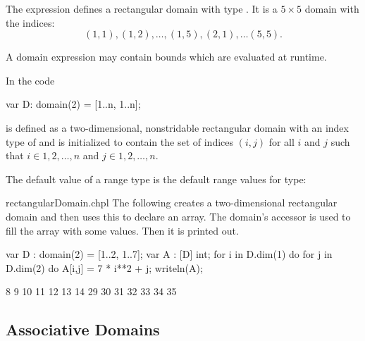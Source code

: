 \begin{example}
The expression \chpl{[1..5, 1..5]} defines a rectangular domain with
type   .
It is a $5 \times 5$ domain with the indices:
\begin{equation}
(1, 1), (1, 2), \ldots, (1, 5), (2, 1), \ldots (5, 5).
\end{equation}
\end{example}

A domain expression may contain bounds which are evaluated at runtime.
\begin{example}
In the code
\begin{chapel}
var D: domain(2) = [1..n, 1..n];
\end{chapel}

 is defined as a two-dimensional, nonstridable rectangular
domain with an index type of  and is initialized to
contain the set of indices $(i,j)$ for all $i$ and $j$ such that
$i \in {1, 2, \ldots, n}$ and $j \in {1, 2, \ldots, n}$.
\end{example}


The default value of a range type is the  default range
values for type:
\begin{quote}
\end{quote}

\begin{chapelexample}{rectangularDomain.chpl}
The following creates a two-dimensional rectangular domain and then uses this to
declare an array.  The domain's  accessor is used to fill the array with
some values.  Then it is printed out.
\begin{chapel}
var D : domain(2) = [1..2, 1..7];
var A : [D] int;
for i in D.dim(1) do
  for j in D.dim(2) do
    A[i,j] = 7 * i**2 + j;
writeln(A);
\end{chapel}
\begin{chapeloutput}
8 9 10 11 12 13 14
29 30 31 32 33 34 35
\end{chapeloutput}
\end{chapelexample}

\subsection{Associative Domains}

